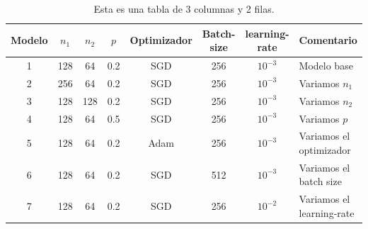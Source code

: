 \documentclass[aps,prl,twocolumn,groupedaddress]{revtex4-2}
\begin{document}
%
\begin{table}%
\begin{ruledtabular}
\begin{tabular}{cccccccl} %
Modelo & $n_1$ & $n_2$ & $p$ & Optimizador & Batch-size & learning-rate & Comentario\\ %
\hline
1 & 128 & 64 & 0.2 & SGD & 256 & $10^{-3}$ & Modelo base\\
2 & 256 & 64 & 0.2 & SGD & 256 & $10^{-3}$ & Variamos $n_1$ \\
3 & 128 & 128 & 0.2 & SGD & 256 & $10^{-3}$ & Variamos $n_2$ \\
4 & 128 & 64 & 0.5 & SGD & 256 & $10^{-3}$ & Variamos $p$ \\
5 & 128 & 64 & 0.2 & Adam & 256 & $10^{-3}$ & Variamos el optimizador \\
6 & 128 & 64 & 0.2 & SGD & 512 & $10^{-3}$ & Variamos el batch size \\
7 & 128 & 64 & 0.2 & SGD & 256 & $10^{-2}$ & Variamos el learning-rate \\
\end{tabular}
\end{ruledtabular}
\caption{
\label{tab1}
Esta es una tabla de 3 columnas y 2 filas.
}
\end{table}
\end{document}
